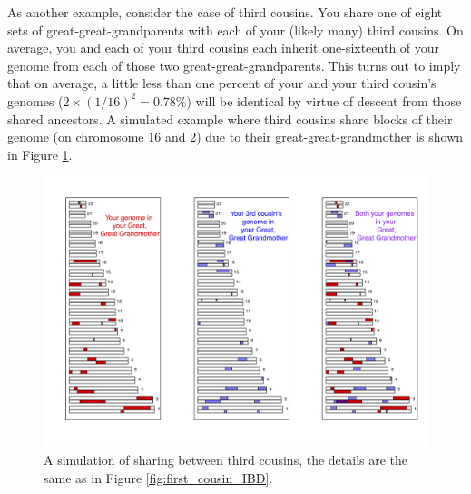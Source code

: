 {{As another example, consider the case of third cousins. You share one of eight sets of great-great-grandparents with each of your (likely many) third cousins. On average, you and each of your third cousins each inherit one-sixteenth of your genome from each of those two great-great-grandparents. This turns out to imply that on average, a little less than one percent of your and your third cousin's genomes ($2 \times (1/16)^2 =0.78\%$) will be identical by virtue of descent from those shared ancestors. A simulated example where third cousins share blocks of their genome (on chromosome 16 and 2) due to their great-great-grandmother is shown in Figure \ref{fig:third_cousin_IBD}.

\begin{figure}
\begin{center}
\includegraphics[width= \textwidth]{figures/sharing_relatives/Third_cousin_overlap_1.png}
\end{center}
\caption[]{A simulation of sharing between third cousins, the details are the same as in Figure \ref{fig:first_cousin_IBD}.} \label{fig:third_cousin_IBD}
\end{figure}


}}
